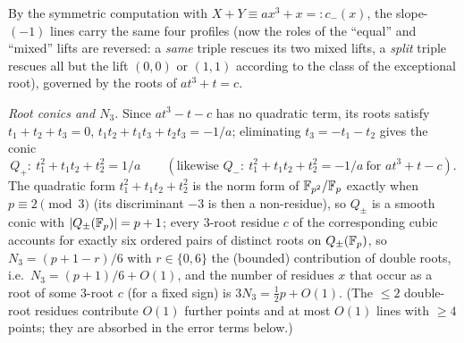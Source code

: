 By the symmetric computation with $X+Y\equiv ax^3+x=:c_-(x)$, the slope-$(-1)$ lines carry the same four profiles
(now the roles of the ``equal'' and ``mixed'' lifts are reversed: a \emph{same} triple rescues its two mixed lifts, a
\emph{split} triple rescues all but the lift $(0,0)$ or $(1,1)$ according to the class of the exceptional root),
governed by the roots of $at^3+t=c$.

\smallskip\noindent\emph{Root conics and $N_3$.} Since $at^3-t-c$ has no quadratic term, its roots satisfy
$t_1+t_2+t_3=0$, $t_1t_2+t_1t_3+t_2t_3=-1/a$; eliminating $t_3=-t_1-t_2$ gives the conic
\[
Q_+:\ t_1^2+t_1t_2+t_2^2=1/a\qquad(\text{likewise }Q_-:\ t_1^2+t_1t_2+t_2^2=-1/a\ \text{for }at^3+t-c).
\]
The quadratic form $t_1^2+t_1t_2+t_2^2$ is the norm form of $\mathbb F_{p^2}/\mathbb{F}_p$ exactly when $p\equiv2\pmod3$
(its discriminant $-3$ is then a non-residue), so $Q_\pm$ is a smooth conic with $|Q_\pm(\mathbb{F}_p)|=p+1$; every
$3$-root residue $c$ of the corresponding cubic accounts for exactly six ordered pairs of distinct roots on
$Q_\pm(\mathbb{F}_p)$, so $N_3=(p+1-r)/6$ with $r\in\{0,6\}$ the (bounded) contribution of double roots, i.e.\
$N_3=(p+1)/6+O(1)$, and the number of residues $x$ that occur as a root of some $3$-root $c$ (for a fixed sign) is
$3N_3=\tfrac12p+O(1)$. (The $\le2$ double-root residues contribute $O(1)$ further points and at most $O(1)$ lines with $\ge4$
points; they are absorbed in the error terms below.)

